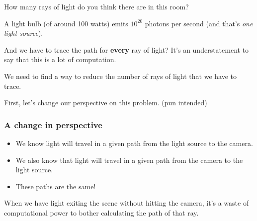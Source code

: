 \documentclass[12pt]{beamer}
\begin{document}
  \begin{frame}

    How many rays of light do you think there are in this room?

  \end{frame}

  \begin{frame}

    A light bulb (of around 100 watts) emits $10^{20}$ photons per second (and that's \textit{one light source}).

    \hfill

    And we have to trace the path for \textbf{every} ray of light?
    It's an understatement to say that this is a lot of computation.

    \hfill

    We need to find a way to reduce the number of rays of light that we have to trace.

    First, let's change our perspective on this problem. (pun intended)

  \end{frame}

  \begin{frame}
    \frametitle{A change in perspective}

    \begin{itemize}
      \item We know light will travel in a given path from the light source to the camera.
      \item We also know that light will travel in a given path from the camera to the light source.
      \item These paths are the same!
    \end{itemize}

    \hfill

    When we have light exiting the scene without hitting the camera, it's a waste of computational power to bother calculating the path of that ray.



  \end{frame}
\end{document}
